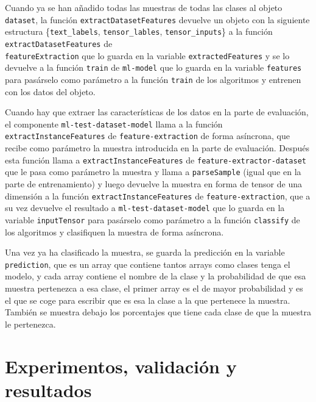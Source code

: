 \documentclass[a4paper, 12pt]{book}
\begin{document}
Cuando ya se han añadido todas las muestras de todas las clases al objeto \texttt{dataset}, la función \texttt{extractDatasetFeatures} devuelve un objeto con la siguiente estructura \{\texttt{text\_labels}, \texttt{tensor\_lables}, \texttt{tensor\_inputs}\} a la función \texttt{extractDatasetFeatures} de \\ \texttt{featureExtraction} que lo guarda en la variable \texttt{extractedFeatures} y se lo devuelve a la función \texttt{train} de \texttt{ml-model} que lo guarda en la variable \texttt{features} para pasárselo como parámetro a la función \texttt{train} de los algoritmos y entrenen con los datos del objeto.

Cuando hay que extraer las características de los datos en la parte de evaluación, el componente \texttt{ml-test-dataset-model} llama a la función \texttt{extractInstanceFeatures} de \texttt{feature-extraction} de forma asíncrona, que recibe como parámetro la muestra introducida en la parte de evaluación. 
Después esta función llama a \texttt{extractInstanceFeatures} de \texttt{feature-extractor-dataset} que le pasa como parámetro la muestra y llama a \texttt{parseSample} (igual que en la parte de entrenamiento) y luego devuelve la muestra en forma de tensor de una dimensión a la función \texttt{extractInstanceFeatures} de \texttt{feature-extraction}, que a su vez devuelve el resultado a \texttt{ml-test-dataset-model} que lo guarda en la variable \texttt{inputTensor} para pasárselo como parámetro a la función \texttt{classify} de los algoritmos y clasifiquen la muestra de forma asíncrona. 

Una vez ya ha clasificado la muestra, se guarda la predicción en la variable \texttt{prediction}, que es un array que contiene tantos arrays como clases tenga el modelo, y cada array contiene el nombre de la clase y la probabilidad de que esa muestra pertenezca a esa clase, el primer array es el de mayor probabilidad y es el que se coge para escribir que es esa la clase a la que pertenece la muestra. 
También se muestra debajo los porcentajes que tiene cada clase de que la muestra le pertenezca.



\cleardoublepage
\chapter{Experimentos, validación y resultados}
\end{document}
